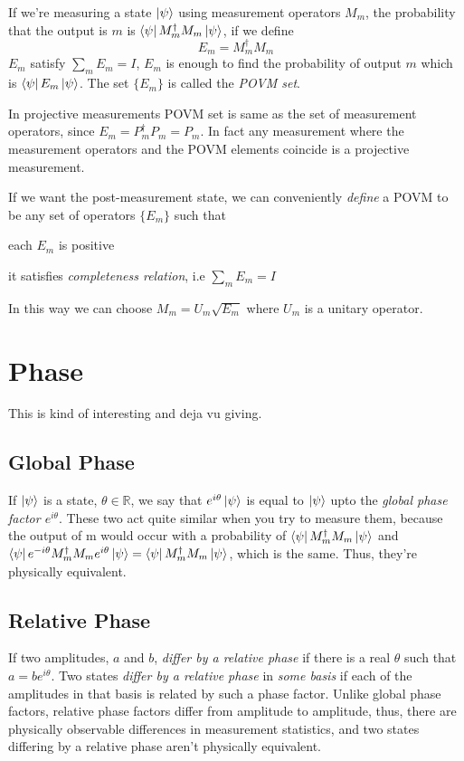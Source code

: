 If we're measuring a state $\ket{\psi}$ using measurement operators $M_m$, the probability that the output is $m$ is $\bra{\psi}M_m^\dag M_m\ket{\psi}$, if we define
\begin{equation}
    E_m = M_m^\dag M_m
\end{equation}
$E_m$ satisfy $\sum_m E_m = I$, $E_m$ is enough to find the probability of output $m$
which is $\bra{\psi}E_m\ket{\psi}$. The set $\{E_m\}$ is called the \textit{POVM set}.

In projective measurements POVM set is same as the set of measurement operators, since $E_m = P_m^\dag P_m = P_m$. In fact any measurement where the measurement operators and the POVM elements coincide is a projective measurement.

If we want the post-measurement state, we can conveniently \textit{define} a POVM to be any set of operators $\{E_m\}$ such that \begin{enumerate*}[label=(\alph*)]
    \item each $E_m$ is positive
    \item it satisfies \textit{completeness relation}, i.e $\sum_m E_m = I$
\end{enumerate*}
In this way we can choose $M_m = U_m\sqrt{E_m}$ where $U_m$ is a unitary operator.

\section{Phase}
This is kind of interesting and deja vu giving.
\subsection{Global Phase}
If $\ket{\psi}$ is a state, $\theta \in \mathbb{R}$, we say that $e^{i\theta}\ket{\psi}$ is equal to $\ket{\psi}$ upto the \textit{global phase factor $e^{i\theta}$}. These two act quite similar when you try to measure them, because the output of m would occur with a probability of $\bra{\psi}M_m^\dag M_m\ket{\psi}$ and $\bra{\psi}e^{-i\theta}M_m^\dag M_m e^{i\theta}\ket{\psi} = \bra{\psi}M_m^\dag M_m\ket{\psi}$, which is the same.
Thus, they're physically equivalent.

\subsection{Relative Phase}
If two amplitudes, $a$ and $b$, \textit{differ by a relative phase} if there is a real $\theta$ such that $a = be^{i\theta}$. Two states \textit{differ by a relative phase} in \textit{some basis} if each of the amplitudes in that basis is related by such a phase factor.
Unlike global phase factors, relative phase factors differ from amplitude to amplitude, thus, there are physically observable differences in measurement statistics, and two states differing by a relative phase aren't physically equivalent.

